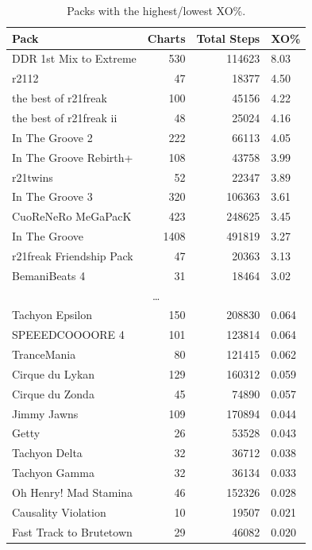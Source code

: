 \documentclass[10pt]{sigplanconf}
\begin{document}
\begin{table}[p]
	\begin{center}
		\small
	\begin{tabular}{l|r|r|l}
		\bf Pack & \bf Charts & \bf Total Steps & \bf XO\% \\
		\hline
		DDR 1st Mix to Extreme   &  530 & 114623 & 8.03 \\
		r2112                    &   47 &  18377 & 4.50 \\
		the best of r21freak     &  100 &  45156 & 4.22 \\
		the best of r21freak ii  &   48 &  25024 & 4.16 \\
		In The Groove 2          &  222 &  66113 & 4.05 \\
		In The Groove Rebirth+   &  108 &  43758 & 3.99 \\
		r21twins                 &   52 &  22347 & 3.89 \\
		In The Groove 3          &  320 & 106363 & 3.61 \\
		CuoReNeRo MeGaPacK       &  423 & 248625 & 3.45 \\
		In The Groove            & 1408 & 491819 & 3.27 \\
		r21freak Friendship Pack &   47 &  20363 & 3.13 \\
		BemaniBeats 4            &   31 &  18464 & 3.02 \\
		\multicolumn{4}{c}{\normalsize\dots} \\
		Tachyon Epsilon          &  150 & 208830 & 0.064 \\
		SPEEEDCOOOORE 4          &  101 & 123814 & 0.064 \\
		TranceMania              &   80 & 121415 & 0.062 \\
		Cirque du Lykan          &  129 & 160312 & 0.059 \\
		Cirque du Zonda          &   45 &  74890 & 0.057 \\
		Jimmy Jawns              &  109 & 170894 & 0.044 \\
		Getty                    &   26 &  53528 & 0.043 \\
		Tachyon Delta            &   32 &  36712 & 0.038 \\
		Tachyon Gamma            &   32 &  36134 & 0.033 \\
		Oh Henry! Mad Stamina    &   46 & 152326 & 0.028 \\
		Causality Violation      &   10 &  19507 & 0.021 \\
		Fast Track to Brutetown  &   29 &  46082 & 0.020 \\
	\end{tabular}
	\end{center}
	\caption{Packs with the highest/lowest XO\%.}
	\label{tab:pack-xo}
\end{table}
\end{document}
